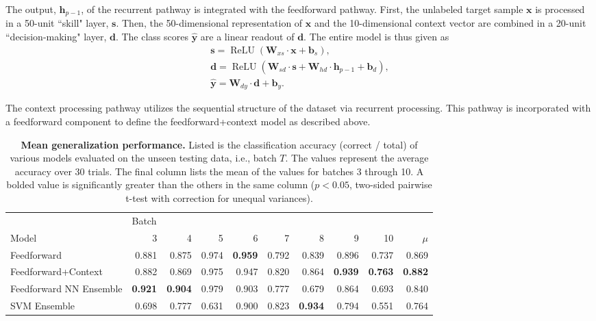 \documentclass[onecolumn,pre,floats,aps,amsmath,amssymb,superscriptaddress]{revtex4-1}
\DeclareMathOperator{\relu}{ReLU}
\begin{document}
The output, $\mathbf{h}_{p-1}$,  of the recurrent pathway is integrated with the feedforward pathway. First, the unlabeled target sample $\mathbf{x}$ is processed in a 50-unit ``skill" layer, $\mathbf{s}$. Then, the 50-dimensional representation of $\mathbf{x}$ and the 10-dimensional context vector are combined in a 20-unit ``decision-making" layer, $\mathbf{d}$.  The class scores $\hat{\mathbf{y}}$ are a linear readout of $\mathbf{d}$. The entire model is thus given as
\begin{equation}
\begin{split}
\mathbf{s}=\relu(\mathbf{W}_{xs}\cdot\mathbf{x}+\mathbf{b}_{s}), \\
\mathbf{d}=\relu(\mathbf{W}_{sd}\cdot\mathbf{s} + \mathbf{W}_{hd}\cdot\mathbf{h}_{p-1}+\mathbf{b}_{d} ), \\
\hat{\mathbf{y}}=\mathbf{W}_{dy}\cdot\mathbf{d}+\mathbf{b}_{y}.
\end{split}
\end{equation}

The context processing pathway utilizes the sequential structure of the dataset via recurrent processing. This pathway is incorporated with a feedforward component to define the feedforward+context model as described above.

\begin{table}[t]
\setlength{\tabcolsep}{1em}\begin{tabular}{lrrrrrrrrr}
& \multicolumn{6}{l}{Batch }\\
\cline{2-10}
 Model        &       3 &       4 &       5 &       6 &       7 &       8 &       9 &      10 &   $\mu$\\
\hline
 Feedforward   & 0.881          & 0.875          & 0.974          & \textbf{0.959} & 0.792          & 0.839          & 0.896          & 0.737          & 0.869          \\
 Feedforward+Context      & 0.882          & 0.869          & 0.975          & 0.947          & 0.820          & 0.864          & \textbf{0.939} & \textbf{0.763} & \textbf{0.882} \\
 Feedforward NN Ensemble  & \textbf{0.921} & \textbf{0.904} & 0.979 & 0.903          & 0.777          & 0.679          & 0.864          & 0.693          & 0.840          \\
 SVM Ensemble & 0.698          & 0.777          & 0.631          & 0.900          & 0.823 & \textbf{0.934} & 0.794          & 0.551          & 0.764          \\

\hline
\end{tabular}
\caption{\textbf{Mean generalization performance.} Listed is the classification accuracy (correct / total) of various models evaluated on the unseen testing data, i.e., batch $T$. The values represent the average accuracy over 30 trials. The final column lists the mean of the values for batches 3 through 10. A bolded value is significantly greater than the others in the same column ($p < 0.05$, two-sided pairwise t-test with correction for unequal variances).}
\end{table}
\end{document}
